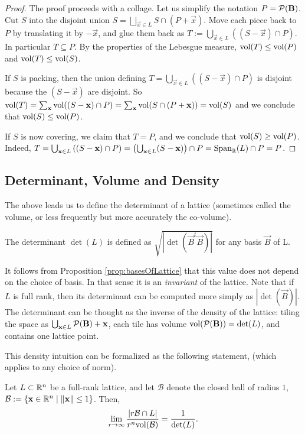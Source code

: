 \begin{proof} The proof proceeds with a collage.
Let us simplify the notation $P = \mathcal P(\mathbf{B})$.
Cut $S$ into the disjoint union $S = \bigsqcup_{\vec x \in L} S \cap (P + \vec x)$.
Move each piece back to $P$ by translating it by $-\vec x$, and glue them back as $T := \bigcup_{\vec x \in L} \left((S - \vec x) \cap P\right)$.
In particular $T \subseteq P$.
By the properties of the Lebesgue measure, $\mathrm{vol}(T) \leq \mathrm{vol}(P)$ and $\mathrm{vol}(T) \leq \mathrm{vol}(S)$. 

If $S$ is packing, then the union defining $T = \bigcup_{\vec x \in L} \left((S - \vec x) \cap P\right)$ is disjoint because the $(S - \vec x)$ are disjoint.
So $\mathrm{vol}(T) = \sum_{\mathbf{x}} \mathrm{vol}((S - \mathbf{x}) \cap P) = \sum_{\mathbf{x}} \mathrm{vol}(S \cap (P + \mathbf{x})) = \mathrm{vol}(S)$ and we conclude that $\mathrm{vol}(S) \leq \mathrm{vol}(P)$. 

If $S$ is now covering, we claim that $T = P$, and we conclude that $\mathrm{vol}(S) \geq \mathrm{vol}(P)$. Indeed, $T = \bigcup_{\mathbf{x} \in L} \left((S - \mathbf{x}) \cap P\right) = \left(\bigcup_{\mathbf{x} \in L} (S - \mathbf{x})\right) \cap P = \operatorname{Span}_{\mathbb{R}}(L) \cap P = P$.
\end{proof}

\subsection{Determinant, Volume and Density}
The above leads us to define the determinant of a lattice (sometimes called the volume, or less frequently but more accurately the co-volume).

\begin{definition} The determinant $\det(L)$ is defined as $\sqrt{|\det(\vec B^t \vec B)|}$ for any basis $\vec B$ of L.
\end{definition}
It follows from Proposition \ref{prop:basesOfLattice} that this value does not depend on the choice of basis.
In that sense it is an \emph{invariant} of the lattice.
Note that if $L$ is full rank, then its determinant can be computed more simply as $|\det (\vec B)|$.
The determinant can be thought as the inverse of the density of the lattice: tiling the space as $\bigcup_{\mathbf{x} \in L} \mathcal P(\mathbf{B}) + \mathbf{x}$, each tile has volume  $\mathrm{vol}(\mathcal P(\mathbf{B})) = \mathrm{det}(L)$, and contains one lattice point. 

This density intuition can be formalized as the following statement, (which applies to any choice of norm).
\begin{theorem}\label{thm:densityTheorem} Let $L \subset \mathbb{R}^n$ be a full-rank lattice, and let $\mathcal B$ denote the closed ball of radius $1$, $\mathcal B := \{ \mathbf{x} \in \mathbb{R}^n \mid \|\mathbf{x}\|\leq 1\}$. Then, 
\[ \lim_{r \rightarrow \infty} \frac {\left |r\mathcal B \cap L\right |} {r^n\mathrm{vol}(\mathcal B)} = \frac 1 {\mathrm{det} ( L)}.\]
\end{theorem}

